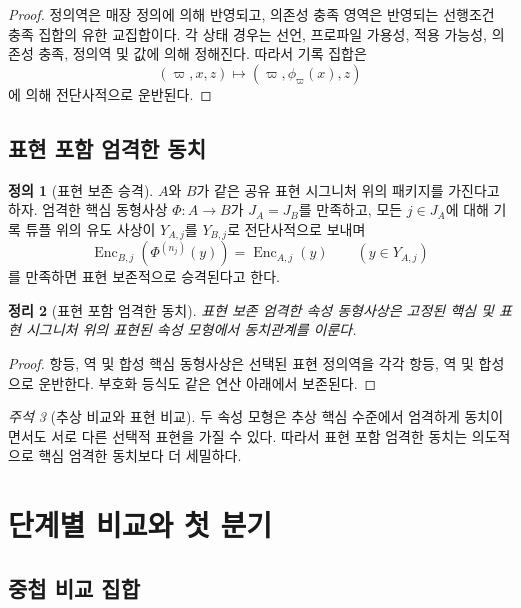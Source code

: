 \documentclass[11pt]{article}
\newcommand{\Enc}{\operatorname{Enc}}
\newtheorem{theorem}{정리}[section]
\theoremstyle{definition}
\newtheorem{definition}[theorem]{정의}
\theoremstyle{remark}
\newtheorem{remark}[theorem]{주석}
\begin{document}
\begin{proof}
정의역은 매장 정의에 의해 반영되고, 의존성 충족 영역은 반영되는 선행조건 충족 집합의 유한 교집합이다. 각 상태 경우는 선언, 프로파일 가용성, 적용 가능성, 의존성 충족, 정의역 및 값에 의해 정해진다.
따라서 기록 집합은
\[
(\varpi,x,z)\longmapsto(\varpi,\phi_{\varpi}(x),z)
\]
에 의해 전단사적으로 운반된다.
\end{proof}

\subsection{표현 포함 엄격한 동치}

\begin{definition}[표현 보존 승격]
\(A\)와 \(B\)가 같은 공유 표현 시그니처 위의 패키지를 가진다고 하자.
엄격한 핵심 동형사상 \(\Phi:A\to B\)가 \(J_A=J_B\)를 만족하고, 모든 \(j\in J_A\)에 대해 기록 튜플 위의 유도 사상이 \(Y_{A,j}\)를 \(Y_{B,j}\)로 전단사적으로 보내며
\[
\Enc_{B,j}(\Phi^{(n_j)}(y))=\Enc_{A,j}(y)
\qquad
(y\in Y_{A,j})
\]
를 만족하면 표현 보존적으로 승격된다고 한다.
\end{definition}

\begin{theorem}[표현 포함 엄격한 동치]
표현 보존 엄격한 속성 동형사상은 고정된 핵심 및 표현 시그니처 위의 표현된 속성 모형에서 동치관계를 이룬다.
\end{theorem}

\begin{proof}
항등, 역 및 합성 핵심 동형사상은 선택된 표현 정의역을 각각 항등, 역 및 합성으로 운반한다.
부호화 등식도 같은 연산 아래에서 보존된다.
\end{proof}

\begin{remark}[추상 비교와 표현 비교]
두 속성 모형은 추상 핵심 수준에서 엄격하게 동치이면서도 서로 다른 선택적 표현을 가질 수 있다.
따라서 표현 포함 엄격한 동치는 의도적으로 핵심 엄격한 동치보다 더 세밀하다.
\end{remark}

\section{단계별 비교와 첫 분기}
\label{sec:branching}

\subsection{중첩 비교 집합}
\end{document}
